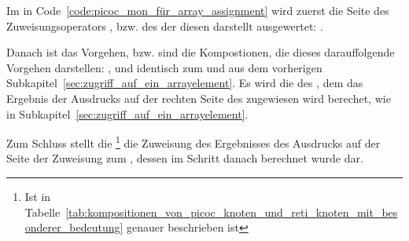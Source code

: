 Im  in Code~\ref{code:picoc_mon_für_array_assignment} wird zuerst die  Seite des  Zuweisungsoperators \smalltt{=}, bzw. des  der diesen darstellt ausgewertet: .

Danach ist das Vorgehen, bzw. sind die Kompostionen, die dieses darauffolgende Vorgehen darstellen: ,  und  identisch zum  und  aus dem vorherigen Subkapitel~\ref{sec:zugriff_auf_ein_arrayelement}. Es wird die  des , dem das Ergebnis der Ausdrucks auf der rechten Seite des  \smalltt{=} zugewiesen wird berechet, wie in Subkapitel~\ref{sec:zugriff_auf_ein_arrayelement}.

Zum Schluss stellt die  \footnote{Ist in Tabelle~\ref{tab:kompositionen_von_picoc_knoten_und_reti_knoten_mit_besonderer_bedeutung} genauer beschrieben ist} die Zuweisung \smalltt{=} des Ergebnisses des Ausdrucks auf der  Seite der Zuweisung zum , dessen  im Schritt danach berechnet wurde dar.


